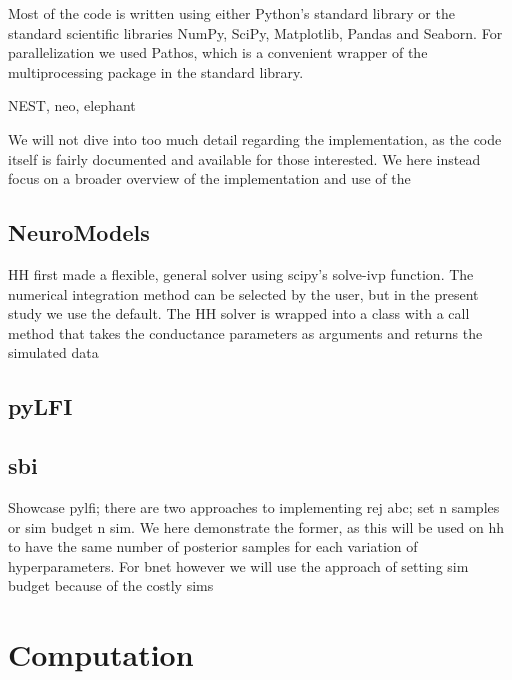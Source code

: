Most of the code is written using either Python's standard library or the standard scientific libraries NumPy, SciPy, Matplotlib, Pandas and Seaborn. For parallelization we used Pathos, which is a convenient wrapper of the multiprocessing package in the standard library. 

NEST, neo, elephant 

We will not dive into too much detail regarding the implementation, as the code itself is fairly documented and available for those interested. We here instead focus on a broader overview of the implementation and use of the 

\subsection{NeuroModels}

HH first made a flexible, general solver using scipy's solve-ivp function. The numerical integration method can be selected by the user, but in the present study we use the default. The HH solver is wrapped into a class with a call method that takes the conductance parameters as arguments and returns the simulated data

\subsection{pyLFI}

\subsection{sbi}

Showcase pylfi; there are two approaches to implementing rej abc; set n samples or sim budget n sim. We here demonstrate the former, as this will be used on hh to have the same number of posterior samples for each variation of hyperparameters. For bnet however we will use the approach of setting sim budget because of the costly sims

\section{Computation}

